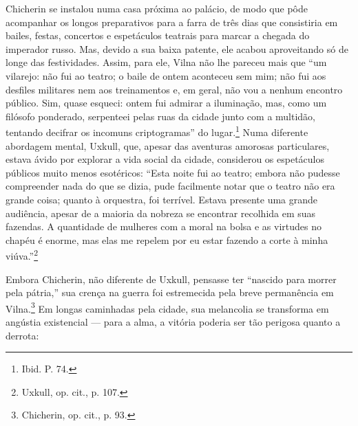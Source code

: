 Chicherin se instalou numa casa próxima ao palácio, de modo que pôde
acompanhar os longos preparativos para a farra de três dias que
consistiria em bailes, festas, concertos e espetáculos teatrais para
marcar a chegada do imperador russo. Mas, devido a sua baixa patente,
ele acabou aproveitando só de longe das festividades. Assim, para ele,
Vilna não lhe pareceu mais que ``um vilarejo: não fui ao teatro; o baile
de ontem aconteceu sem mim; não fui aos desfiles militares nem aos
treinamentos e, em geral, não vou a nenhum encontro público. Sim, quase
esqueci: ontem fui admirar a iluminação, mas, como um filósofo
ponderado, serpenteei pelas ruas da cidade junto com a multidão,
tentando decifrar os incomuns criptogramas'' do lugar.\footnote{Ibid. P.
  74.} Numa diferente abordagem mental, Uxkull, que, apesar das
aventuras amorosas particulares, estava ávido por explorar a vida social
da cidade, considerou os espetáculos públicos muito menos esotéricos:
``Esta noite fui ao teatro; embora não pudesse compreender nada do que
se dizia, pude facilmente notar que o teatro não era grande coisa;
quanto à orquestra, foi terrível. Estava presente uma grande audiência,
apesar de a maioria da nobreza se encontrar recolhida em suas fazendas.
A quantidade de mulheres com a moral na bolsa e as virtudes no chapéu é
enorme, mas elas me repelem por eu estar fazendo a corte à minha
viúva.''\footnote{Uxkull, op. cit., p. 107.}

Embora Chicherin, não diferente de Uxkull, pensasse ter ``nascido para
morrer pela pátria,'' sua crença na guerra foi estremecida pela breve
permanência em Vilna.\footnote{Chicherin, op. cit., p. 93.} Em longas
caminhadas pela cidade, sua melancolia se transforma em angústia
existencial --- para a alma, a vitória poderia ser tão perigosa quanto a
derrota:

